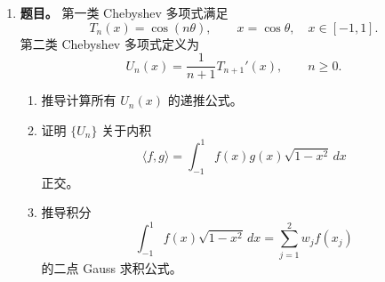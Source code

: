 ﻿\documentclass[UTF8,12pt]{ctexart}
\begin{document}
\begin{enumerate}[label=\textbf{\arabic*.},leftmargin=2.2em]
\textbf{解答。} 设 \(h=L/n\)，复合梯形公式记为
\[
T_{n,L}
=h\left(\frac12f(0)+\sum_{j=1}^{n-1}f(jh)+\frac12f(L)\right).
\]
Euler--Maclaurin 公式给出
\[
T_{n,L}-\int_0^L f(x)\,dx
=\frac{h^2}{12}\bigl(f'(L)-f'(0)\bigr)+O(h^4).
\]
等价地，
\[
\int_0^L f(x)\,dx-T_{n,L}
=\frac{h^2}{12}\bigl(f'(0)-f'(L)\bigr)+O(h^4).
\]
这就是固定 \(L\) 时的主误差项。

因为 \(f(x)\sim Cx^{-1-\alpha}\)，故截断尾项满足
\[
\int_L^\infty f(x)\,dx\sim \frac{C}{\alpha}L^{-\alpha}.
\]
当 \(L\) 随 \(n\) 增大时，梯形离散误差的量级为
\[
O(h^2)=O\left(\frac{L^2}{n^2}\right),
\]
而截断误差量级为 \(O(L^{-\alpha})\)。平衡两项：
\[
\frac{L^2}{n^2}\asymp L^{-\alpha},
\]
得
\[
L^{\alpha+2}\asymp n^2,\qquad
L\asymp n^{2/(\alpha+2)}.
\]
代回任一误差项，得到最优总误差率
\[
O\left(n^{-2\alpha/(\alpha+2)}\right).
\]

对变量代换，有
\[
\frac{dx}{dy}=\frac{2L}{(1-y)^2},
\]
所以
\[
F_L(y)=f\!\left(\frac{L(1+y)}{1-y}\right)\frac{2L}{(1-y)^2},
\qquad
\int_0^\infty f(x)\,dx=\int_{-1}^1F_L(y)\,dy.
\]
设 \(\eta=2/n\) 是 \([-1,1]\) 上的网格宽度。若 \(F_L\) 在端点足够光滑，则 Euler--Maclaurin 公式给出
\[
\int_{-1}^1F_L(y)\,dy-T_n(F_L)
=\frac{\eta^2}{12}\bigl(F_L'(-1)-F_L'(1)\bigr)+O(\eta^4).
\]
但由 \(x\to\infty\) 对应 \(y\to1^-\)，并且
\[
x=\frac{L(1+y)}{1-y}\sim \frac{2L}{1-y},
\]
可得
\[
F_L(y)\sim
C\left(\frac{2L}{1-y}\right)^{-1-\alpha}\frac{2L}{(1-y)^2}
=C\,2^{-\alpha}L^{-\alpha}(1-y)^{\alpha-1}.
\]
因此端点 \(y=1\) 的光滑性由 \(\alpha\) 控制。若 \(\alpha>2\)，则通常具有二阶梯形误差 \(O(n^{-2})\)；若 \(0<\alpha<2\)，端点奇性使误差主阶降为 \(O(n^{-\alpha})\)；\(\alpha=2\) 时常出现临界的对数修正。

于是变量代换法的典型误差阶可写作
\[
O\bigl(n^{-\min\{\alpha,2\}}\bigr)
\]
（\(\alpha=2\) 时需注意可能的对数因子）。截断法最优阶为
\[
O\left(n^{-2\alpha/(\alpha+2)}\right).
\]
对任意有限 \(\alpha>0\)，都有
\[
\min\{\alpha,2\}\ge \frac{2\alpha}{\alpha+2},
\]
且通常严格大于。因此在该渐近模型下，变量代换法通常优于截断法；当 \(\alpha\) 很大时，二者都接近二阶，但变量代换法仍避免了截断尾误差。

\item \textbf{题目。} 第一类 Chebyshev 多项式满足
\[
T_n(x)=\cos(n\theta),\qquad x=\cos\theta,\quad x\in[-1,1].
\]
第二类 Chebyshev 多项式定义为
\[
U_n(x)=\frac1{n+1}T_{n+1}'(x),\qquad n\ge0.
\]
\begin{enumerate}[label=(\alph*),leftmargin=2.0em]
\item 推导计算所有 \(U_n(x)\) 的递推公式。
\item 证明 \(\{U_n\}\) 关于内积
\[
\langle f,g\rangle=\int_{-1}^1 f(x)g(x)\sqrt{1-x^2}\,dx
\]
正交。
\item 推导积分
\[
\int_{-1}^1 f(x)\sqrt{1-x^2}\,dx
=\sum_{j=1}^2w_jf(x_j)
\]
的二点 Gauss 求积公式。
\end{enumerate}


\end{enumerate}
\end{document}
